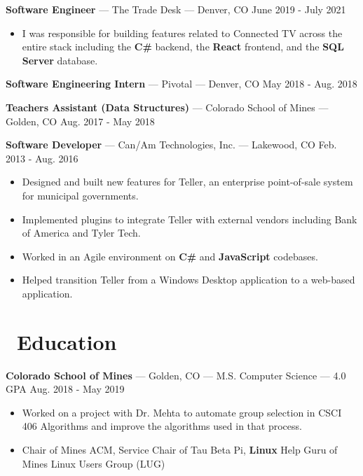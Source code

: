 \documentclass[10pt,letterpaper]{article}
\begin{document}
\textbf{Software Engineer} --- The Trade Desk --- Denver, CO
\hfill June 2019 - July 2021
\begin{itemize}
    \item I was responsible for building features related to Connected TV across
        the entire stack including the \textbf{C\#} backend, the \textbf{React}
        frontend, and the \textbf{SQL Server} database.
\end{itemize}

\textbf{Software Engineering Intern} --- Pivotal --- Denver, CO
\hfill May 2018 - Aug. 2018

\vspace{2pt}
\textbf{Teachers Assistant (Data Structures)} --- Colorado School of Mines ---
Golden, CO \hfill Aug. 2017 - May 2018


\vspace{2pt}
\textbf{Software Developer} --- Can/Am Technologies, Inc. --- Lakewood, CO
\hfill Feb. 2013 - Aug. 2016
\begin{itemize}
    \item Designed and built new features for Teller, an enterprise
        point-of-sale system for municipal governments.
    \item Implemented plugins to integrate Teller with external vendors
        including Bank of America and Tyler Tech.
    \item Worked in an Agile environment on \textbf{C\#} and \textbf{JavaScript}
        codebases.
    \item Helped transition Teller from a Windows Desktop application to a
        web-based application.
\end{itemize}

\section*{\faBook\ Education}
\textbf{Colorado School of Mines} --- Golden, CO --- M.S. Computer Science --- 4.0 GPA
\hfill Aug. 2018 - May 2019
\begin{itemize}
    \item Worked on a project with Dr. Mehta to automate group selection in
        CSCI 406 Algorithms and improve the algorithms used in that process.
    \item Chair of Mines ACM, Service Chair of Tau Beta Pi, \textbf{Linux} Help
        Guru of Mines Linux Users Group (LUG)
\end{itemize}
\end{document}

